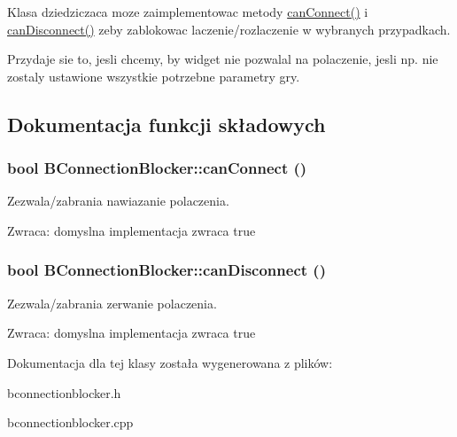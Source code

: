 Klasa dziedziczaca moze zaimplementowac metody \hyperlink{class_b_connection_blocker_2ebcdef0e5570c7331036dd5b6ba4448}{canConnect()} i \hyperlink{class_b_connection_blocker_81e8782c93ac1943a7e19b4ed7ced792}{canDisconnect()} zeby zablokowac laczenie/rozlaczenie w wybranych przypadkach.

Przydaje sie to, jesli chcemy, by widget nie pozwalal na polaczenie, jesli np. nie zostaly ustawione wszystkie potrzebne parametry gry. 

\subsection{Dokumentacja funkcji składowych}
\hypertarget{class_b_connection_blocker_2ebcdef0e5570c7331036dd5b6ba4448}{
\subsubsection[{canConnect}]{\setlength{\rightskip}{0pt plus 5cm}bool BConnectionBlocker::canConnect ()}}
\label{class_b_connection_blocker_2ebcdef0e5570c7331036dd5b6ba4448}


Zezwala/zabrania nawiazanie polaczenia. 

\begin{Desc}
\item[Zwraca:]domyslna implementacja zwraca true \end{Desc}
\hypertarget{class_b_connection_blocker_81e8782c93ac1943a7e19b4ed7ced792}{
\subsubsection[{canDisconnect}]{\setlength{\rightskip}{0pt plus 5cm}bool BConnectionBlocker::canDisconnect ()}}
\label{class_b_connection_blocker_81e8782c93ac1943a7e19b4ed7ced792}


Zezwala/zabrania zerwanie polaczenia. 

\begin{Desc}
\item[Zwraca:]domyslna implementacja zwraca true \end{Desc}


Dokumentacja dla tej klasy została wygenerowana z plików:\begin{CompactItemize}
\item 
bconnectionblocker.h\item 
bconnectionblocker.cpp\end{CompactItemize}
